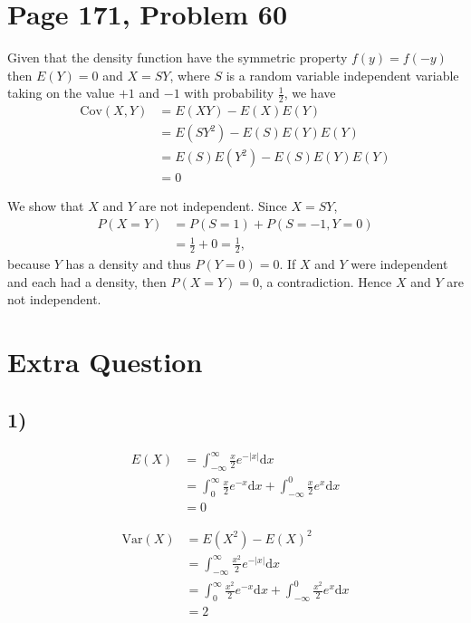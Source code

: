 \documentclass[a4paper, UTF-8]{article}
\theoremstyle{plain}
\begin{document}
\section{Page 171, Problem 60} 

Given that the density function have the symmetric property $f(y) = f(-y)$ then $E(Y) = 0$ and $X = SY$, where $S$ is a random variable independent variable taking on the value $+1$ and $-1$ with probability $\frac{1}{2}$, we have
\begin{align*}
\text{Cov}(X, Y) & = E(XY) - E(X)E(Y) \\
& = E(SY^2) - E(S)E(Y)E(Y) \\
& = E(S)E(Y^2) - E(S)E(Y)E(Y) \\
& = 0
\end{align*}

We show that $X$ and $Y$ are not independent. 
Since $X=SY$,
\begin{align*}
P(X=Y) & = P(S=1) + P(S=-1, Y=0) \\
& = \tfrac{1}{2} + 0 = \tfrac{1}{2},
\end{align*}
because $Y$ has a density and thus $P(Y=0)=0$. If $X$ and $Y$ were independent and each had a density, then $P(X=Y)=0$, a contradiction. Hence $X$ and $Y$ are not independent.

\section{Extra Question} 

\subsection{1)} 

\begin{align*}
E(X) & = \int_{-\infty}^{\infty} \frac{x}{2} e^{-|x|} \mathrm{d}x \\
& = \int_{0}^{\infty} \frac{x}{2} e^{-x} \mathrm{d}x + \int_{-\infty}^{0} \frac{x}{2} e^{x} \mathrm{d}x \\
& = 0
\end{align*}

\begin{align*}
\text{Var}(X) & = E(X^2) - E(X)^2 \\
& = \int_{-\infty}^{\infty} \frac{x^2}{2} e^{-|x|} \mathrm{d}x \\
& = \int_{0}^{\infty} \frac{x^2}{2} e^{-x} \mathrm{d}x + \int_{-\infty}^{0} \frac{x^2}{2} e^{x} \mathrm{d}x \\
& = 2
\end{align*}
\end{document}
